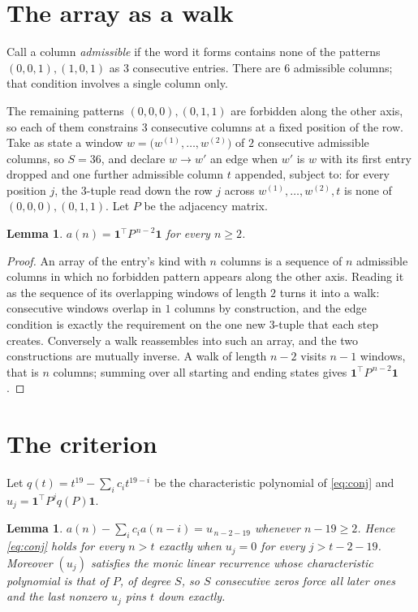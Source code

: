 \documentclass[11pt,a4paper]{article}
\theoremstyle{plain}
\newtheorem{lemma}[theorem]{Lemma}
\theoremstyle{definition}
\begin{document}
\section{The array as a walk}

Call a column \emph{admissible} if the word it forms contains none of the patterns
$(0,0,1), (1,0,1)$ as $3$ consecutive entries. There are $6$ admissible columns; that condition
involves a single column only.

The remaining patterns $(0,0,0), (0,1,1)$ are forbidden along the other axis, so each of them
constrains $3$ consecutive columns at a fixed position of the row. Take as state a
window $w=\bigl(w^{(1)},\dots,w^{(2)}\bigr)$ of $2$ consecutive admissible
columns, so $S=36$, and declare $w\to w'$ an edge when $w'$ is $w$ with its first entry
dropped and one further admissible column $t$ appended, subject to: for every position
$j$, the $3$-tuple read down the row $j$ across $w^{(1)},\dots,w^{(2)},t$
is none of $(0,0,0), (0,1,1)$. Let $P$ be the adjacency matrix.

\begin{lemma}\label{lem:walk}
$a(n)=\mathbf{1}^{\!\top}P^{\,n-2}\mathbf{1}$ for every $n\ge2$.
\end{lemma}

\begin{proof}
An array of the entry's kind with $n$ columns is a sequence of $n$ admissible columns in
which no forbidden pattern appears along the other axis. Reading it as the sequence of its
overlapping windows of length $2$ turns it into a walk: consecutive windows overlap in
$1$ columns by construction, and the edge condition is exactly the requirement on the one
new $3$-tuple that each step creates. Conversely a walk reassembles into such an array,
and the two constructions are mutually inverse. A walk of length $n-2$ visits $n-1$
windows, that is $n$ columns; summing over all starting and ending states gives
$\mathbf{1}^{\!\top}P^{\,n-2}\mathbf{1}$.
\end{proof}

\section{The criterion}

Let $q(t)=t^{19}-\sum_i c_i t^{19-i}$ be the characteristic polynomial of
\eqref{eq:conj} and $u_j=\mathbf{1}^{\!\top}P^{j}q(P)\mathbf{1}$.

\begin{lemma}\label{lem:crit}
$a(n)-\sum_i c_i a(n-i)=u_{\,n-2-19}$ whenever $n-19\ge2$. Hence
\eqref{eq:conj} holds for every $n>t$ exactly when $u_j=0$ for every
$j>t-2-19$. Moreover $(u_j)$ satisfies the monic linear recurrence whose
characteristic polynomial is that of $P$, of degree $S$, so $S$ consecutive zeros force all
later ones and the last nonzero $u_j$ pins $t$ down exactly.
\end{lemma}
\end{document}
